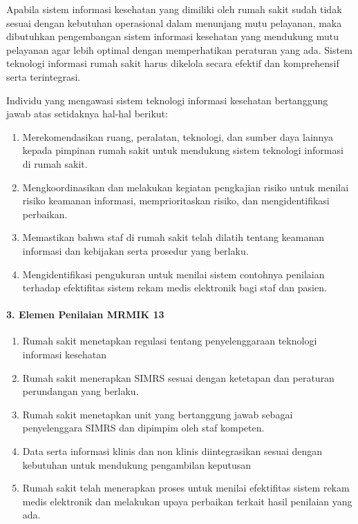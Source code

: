 \documentclass[
]{book}
\providecommand{\tightlist}{%
  \setlength{\itemsep}{0pt}\setlength{\parskip}{0pt}}
\begin{document}
Apabila sistem informasi kesehatan yang dimiliki oleh rumah sakit sudah tidak sesuai dengan kebutuhan operasional dalam menunjang mutu pelayanan, maka dibutuhkan pengembangan sistem informasi kesehatan yang mendukung mutu pelayanan agar lebih optimal dengan memperhatikan peraturan yang ada. Sistem teknologi informasi rumah sakit harus dikelola secara efektif dan komprehensif serta terintegrasi.

Individu yang mengawasi sistem teknologi informasi kesehatan bertanggung jawab atas setidaknya hal-hal berikut:

\begin{enumerate}
\def\labelenumi{\alph{enumi}.}
\tightlist
\item
  Merekomendasikan ruang, peralatan, teknologi, dan sumber daya lainnya kepada pimpinan rumah sakit untuk mendukung sistem teknologi informasi di rumah sakit.
\item
  Mengkoordinasikan dan melakukan kegiatan pengkajian risiko untuk menilai risiko keamanan informasi, memprioritaskan risiko, dan mengidentifikasi perbaikan.
\item
  Memastikan bahwa staf di rumah sakit telah dilatih tentang keamanan informasi dan kebijakan serta prosedur yang berlaku.
\item
  Mengidentifikasi pengukuran untuk menilai sistem contohnya penilaian terhadap efektifitas sistem rekam medis elektronik bagi staf dan pasien.
\end{enumerate}

\hypertarget{elemen-penilaian-mrmik-13}{%
\paragraph*{3. Elemen Penilaian MRMIK 13}\label{elemen-penilaian-mrmik-13}}

\begin{enumerate}
\def\labelenumi{\alph{enumi}.}
\tightlist
\item
  Rumah sakit menetapkan regulasi tentang penyelenggaraan teknologi informasi kesehatan
\item
  Rumah sakit menerapkan SIMRS sesuai dengan ketetapan dan peraturan perundangan yang berlaku.
\item
  Rumah sakit menetapkan unit yang bertanggung jawab sebagai penyelenggara SIMRS dan dipimpim oleh staf kompeten.
\item
  Data serta informasi klinis dan non klinis diintegrasikan sesuai dengan kebutuhan untuk mendukung pengambilan keputusan
\item
  Rumah sakit telah menerapkan proses untuk menilai efektifitas sistem rekam medis elektronik dan melakukan upaya perbaikan terkait hasil penilaian yang ada.
\end{enumerate}
\end{document}

